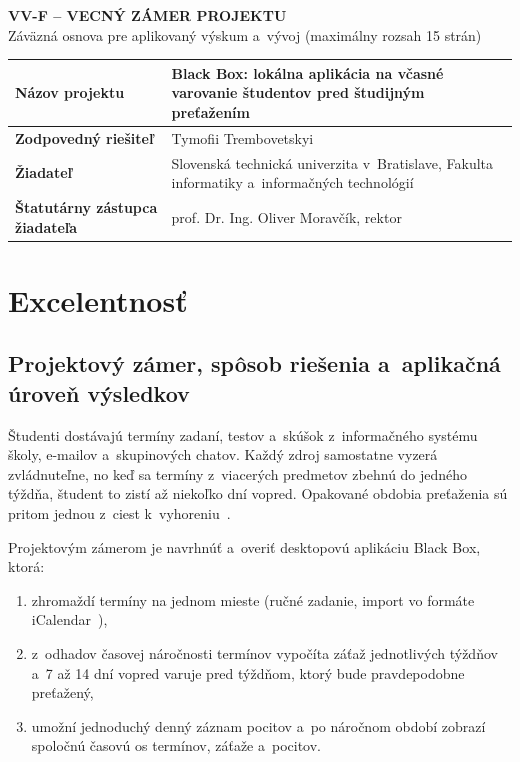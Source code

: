 \documentclass[11pt,a4paper]{article}
\begin{document}
\begin{center}
  {\Large\bfseries VV-F -- VECNÝ ZÁMER PROJEKTU}\\[0.3em]
  Záväzná osnova pre aplikovaný výskum a~vývoj (maximálny rozsah 15 strán)
\end{center}

\renewcommand{\arraystretch}{1.3}
\noindent
\begin{tabularx}{\linewidth}{|>{\bfseries}p{45mm}|X|}
\hline
Názov projektu & Black Box: lokálna aplikácia na včasné varovanie študentov pred študijným preťažením \\ \hline
Zodpovedný riešiteľ & Tymofii Trembovetskyi \\ \hline
Žiadateľ & Slovenská technická univerzita v~Bratislave, Fakulta informatiky a~informačných technológií \\ \hline
Štatutárny zástupca žiadateľa & prof. Dr. Ing. Oliver Moravčík, rektor \\ \hline
\end{tabularx}
\renewcommand{\arraystretch}{1}

\section{Excelentnosť}

\subsection{Projektový zámer, spôsob riešenia a~aplikačná úroveň výsledkov}

Študenti dostávajú termíny zadaní, testov a~skúšok z~informačného systému
školy, e-mailov a~skupinových chatov. Každý zdroj samostatne vyzerá zvládnuteľne,
no keď sa termíny z~viacerých predmetov zbehnú do jedného týždňa, študent to
zistí až niekoľko dní vopred. Opakované obdobia preťaženia sú pritom jednou
z~ciest k~vyhoreniu~\cite{Maslach:Burnout,Schaufeli:Burnout}.

Projektovým zámerom je navrhnúť a~overiť desktopovú aplikáciu Black Box,
ktorá:
\begin{enumerate}[nosep]
  \item zhromaždí termíny na jednom mieste (ručné zadanie, import vo formáte
    iCalendar~\cite{RFC5545}),
  \item z~odhadov časovej náročnosti termínov vypočíta záťaž jednotlivých
    týždňov a~7 až 14 dní vopred varuje pred týždňom, ktorý bude
    pravdepodobne preťažený,
  \item umožní jednoduchý denný záznam pocitov a~po náročnom období zobrazí
    spoločnú časovú os termínov, záťaže a~pocitov.
\end{enumerate}
\end{document}
